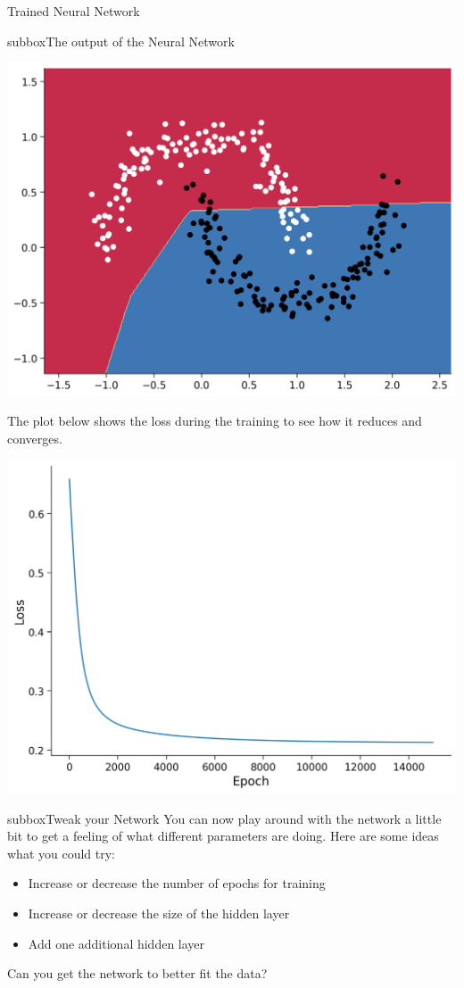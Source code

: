 \begin{multicols}{3}
\begin{textbox}{Trained Neural Network}
\begin{subbox}{subbox}{The output of the Neural Network}
\begin{center}
\includegraphics[scale=0.28]{Figures/NN/W1D1_Tutorial1_Learnt.png}
\end{center}
The plot below shows the loss during the training to see how it reduces and converges.
\begin{center}
\includegraphics[scale=0.28]{Figures/NN/W1D1_Tutorial1_181_LossFunction.png}
\end{center}

\end{subbox}
\begin{subbox}{subbox}{Tweak your Network}
\scriptsize
You can now play around with the network a little bit to get a feeling of what different parameters are doing. Here are some ideas what you could try:
\begin{itemize}
    \item 
Increase or decrease the number of epochs for training
\item Increase or decrease the size of the hidden layer
\item Add one additional hidden layer
\end{itemize}
Can you get the network to better fit the data?


\end{subbox}
\end{textbox}
\end{multicols}
